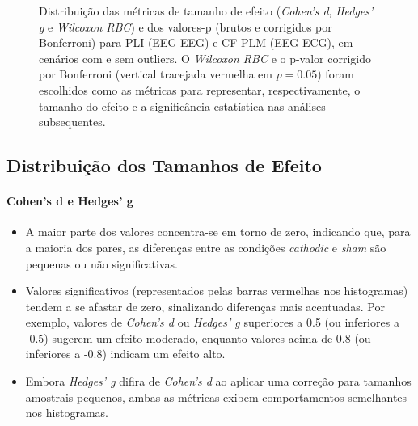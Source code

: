 \begin{figure}[htb]
{    }
    \quad
    \caption[Distribuições de tamanhos de efeito e valores-p]{Distribuição das métricas de tamanho de efeito (\emph{Cohen's d}, \emph{Hedges' g} e \emph{Wilcoxon RBC}) e dos valores-p (brutos e corrigidos por Bonferroni) para PLI (EEG-EEG) e CF-PLM (EEG-ECG), em cenários com e sem outliers. O \emph{Wilcoxon RBC} e o p-valor corrigido por Bonferroni (vertical tracejada vermelha em $p=0.05$) foram escolhidos como as métricas para representar, respectivamente, o tamanho do efeito e a significância estatística nas análises subsequentes.}
    \label{fig:effectsizehist_all}    
\end{figure}
\subsection{Distribuição dos Tamanhos de Efeito}

\paragraph{Cohen's d e Hedges' g}
\begin{itemize}
    \item A maior parte dos valores concentra-se em torno de zero, indicando que, para a maioria dos pares, as diferenças entre as condições \emph{cathodic} e \emph{sham} são pequenas ou não significativas.
    \item Valores significativos (representados pelas barras vermelhas nos histogramas) tendem a se afastar de zero, sinalizando diferenças mais acentuadas. Por exemplo, valores de \emph{Cohen's d} ou \emph{Hedges' g} superiores a 0.5 (ou inferiores a -0.5) sugerem um efeito moderado, enquanto valores acima de 0.8 (ou inferiores a -0.8) indicam um efeito alto.
    \item Embora \emph{Hedges' g} difira de \emph{Cohen's d} ao aplicar uma correção para tamanhos amostrais pequenos, ambas as métricas exibem comportamentos semelhantes nos histogramas.
\end{itemize}

